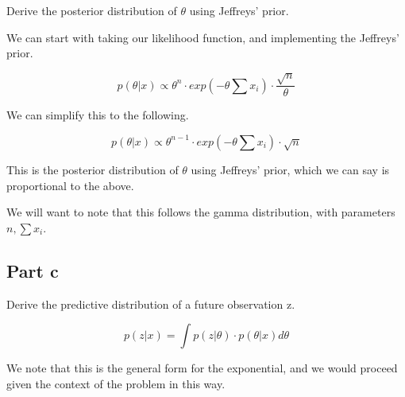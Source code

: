 \documentclass[12pt, letterpaper]{article}
\begin{document}
Derive the posterior distribution of $\theta$ using Jeffreys' prior. 

We can start with taking our likelihood function, and implementing the Jeffreys' prior. 

\begin{equation}
  p(\theta | x) \propto \theta^n \cdot exp(-\theta \sum x_i) \cdot \frac{\sqrt{n}}{\theta} 
\end{equation} 

We can simplify this to the following. 

\begin{equation}
  p(\theta | x) \propto \theta^{n - 1} \cdot exp(-\theta \sum x_i) \cdot \sqrt{n} 
\end{equation} 

This is the posterior distribution of $\theta$ using Jeffreys' prior, which we can say is proportional to the above. 

We will want to note that this follows the gamma distribution, with parameters $n, \sum x_i$. 

\subsection{Part c} 

Derive the predictive distribution of a future observation z. 

\begin{equation}
  p(z | x) = \int p(z | \theta) \cdot p(\theta | x) d\theta 
\end{equation} 

We note that this is the general form for the exponential, and we would proceed given the context of the problem in this way. 
\end{document}
